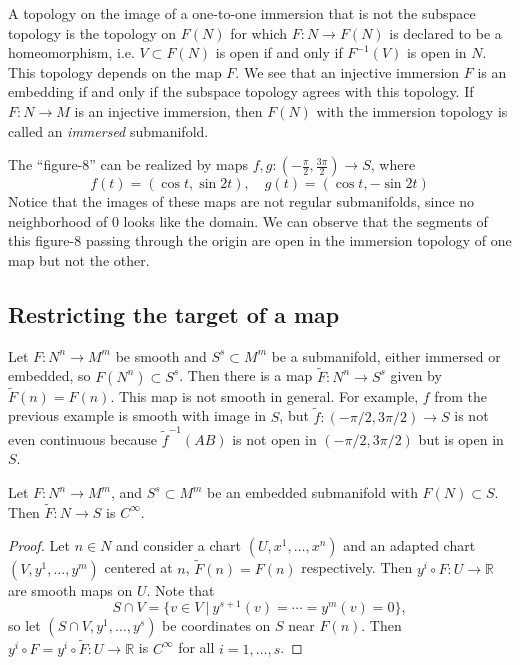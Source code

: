 A topology on the image of a one-to-one immersion that is not the
subspace topology is the topology on $F(N)$ for which
$F: N \to F(N)$ is declared to be a homeomorphism, i.e.
$V \subset F(N)$ is open if and only if $F^{-1}(V)$ is open in $N$.
This topology depends on the map $F$. We see that an injective
immersion $F$ is an embedding if and only if the subspace topology
agrees with this topology. If $F : N \to M$ is an injective immersion,
then $F(N)$ with the immersion topology is called an \emph{immersed}
submanifold.

\begin{xmpl}
The ``figure-8'' can be realized by maps
$f, g: \left(-\frac{\pi}{2}, \frac{3 \pi}{2}\right) \to S$, where
$$
f(t) = (\cos t, \sin 2t), \quad
g(t) = (\cos t, -\sin 2t)
$$
Notice that the images of these maps are not regular submanifolds,
since no neighborhood of 0 looks like the domain. We can observe that
the segments of this figure-8 passing through the origin are open in
the immersion topology of one map but not the other.
\end{xmpl}

\subsection{Restricting the target of a map}
Let $F: N^n \to M^m$ be smooth and $S^s \subset M^m$ be a submanifold,
either immersed or embedded, so $F(N^n) \subset S^s$. Then there is a
map $\tilde{F} : N^n \to S^s$ given by $\tilde{F}(n) = F(n)$. This map
is not smooth in general. For example, $f$ from the previous example
is smooth with image in $S$, but $\tilde{f} : (-\pi/2, 3\pi/2) \to S$
is not even continuous because $\tilde{f}^{-1}(AB)$ is not open in
$(-\pi/2, 3\pi/2)$ but is open in $S$.

\begin{prop}
Let $F : N^n \to M^m$, and $S^s \subset M^m$ be an embedded
submanifold with $F(N) \subset S$. Then
$\tilde{F}: N \to S$ is $C^\infty$.
\end{prop}

\begin{proof}
Let $n \in N$ and consider a chart $(U, x^1, \dots, x^n)$ and an
adapted chart $(V, y^1, \dots, y^m)$ centered at $n$,
$\tilde{F}(n) = F(n)$ respectively. Then
$y^i \circ F : U \to \mathbb{R}$ are smooth maps on $U$. Note that
$$
  S \cap V
= \{ v \in V ~\vert~ y^{s+1}(v) = \cdots = y^m(v) = 0 \},
$$
so let $(S \cap V, y^1, \dots, y^s)$ be coordinates on $S$ near
$F(n)$. Then $y^i \circ F = y^i \circ \tilde{F} : U \to \mathbb{R}$ is
$C^\infty$ for all $i=1, \dots, s$.
\end{proof}

